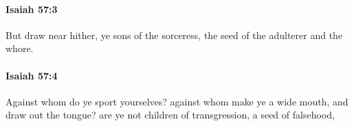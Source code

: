 		\paragraph{Isaiah 57:3} %
			\label{ISAIAH-57-3}

			But draw near hither, ye sons of the sorceress, the seed of the adulterer and the whore.


		\paragraph{Isaiah 57:4} %
			\label{ISAIAH-57-4}

			Against whom do ye sport yourselves? against whom make ye a wide mouth, and draw out the tongue? are ye not children of transgression, a seed of falsehood,


